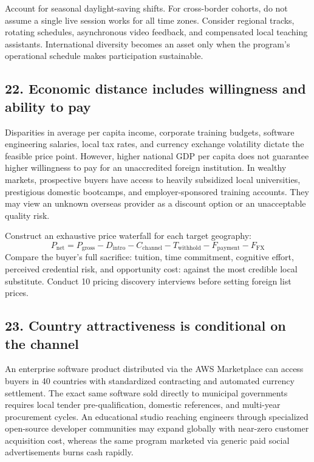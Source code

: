 Account for seasonal daylight-saving shifts. For cross-border cohorts, do not assume a single live session works for all time zones. Consider regional tracks, rotating schedules, asynchronous video feedback, and compensated local teaching assistants. International diversity becomes an asset only when the program's operational schedule makes participation sustainable.

\subsection{22. Economic distance includes willingness and ability to pay}

Disparities in average per capita income, corporate training budgets, software engineering salaries, local tax rates, and currency exchange volatility dictate the feasible price point. However, higher national GDP per capita does not guarantee higher willingness to pay for an unaccredited foreign institution. In wealthy markets, prospective buyers have access to heavily subsidized local universities, prestigious domestic bootcamps, and employer-sponsored training accounts. They may view an unknown overseas provider as a discount option or an unacceptable quality risk.

Construct an exhaustive price waterfall for each target geography:
\begin{equation}
P_{\text{net}} = P_{\text{gross}} - D_{\text{intro}} - C_{\text{channel}} - T_{\text{withhold}} - F_{\text{payment}} - F_{\text{FX}}
\end{equation}
Compare the buyer's full sacrifice: tuition, time commitment, cognitive effort, perceived credential risk, and opportunity cost: against the most credible local substitute. Conduct 10 pricing discovery interviews before setting foreign list prices.

\subsection{23. Country attractiveness is conditional on the channel}

An enterprise software product distributed via the AWS Marketplace can access buyers in 40 countries with standardized contracting and automated currency settlement. The exact same software sold directly to municipal governments requires local tender pre-qualification, domestic references, and multi-year procurement cycles. An educational studio reaching engineers through specialized open-source developer communities may expand globally with near-zero customer acquisition cost, whereas the same program marketed via generic paid social advertisements burns cash rapidly.

